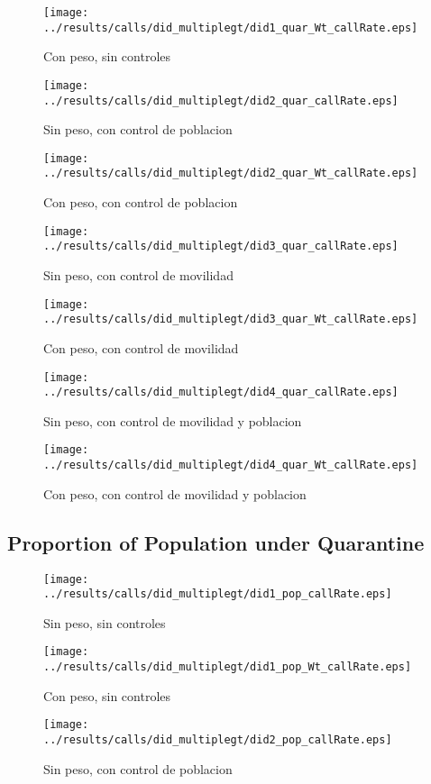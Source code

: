\documentclass[11pt,letterpaper]{article}
\begin{document}
\begin{figure}[H]
\caption{Con peso, sin controles}
\centering
\texttt{[image: ../results/calls/did\_multiplegt/did1\_quar\_Wt\_callRate.eps]}
\end{figure}
\begin{figure}[H]
\caption{Sin peso, con control de poblacion}
\centering
\texttt{[image: ../results/calls/did\_multiplegt/did2\_quar\_callRate.eps]}
\end{figure}

\begin{figure}[H]
\caption{Con peso, con control de poblacion}
\centering
\texttt{[image: ../results/calls/did\_multiplegt/did2\_quar\_Wt\_callRate.eps]}
\end{figure}
\begin{figure}[H]
\caption{Sin peso, con control de movilidad}
\centering
\texttt{[image: ../results/calls/did\_multiplegt/did3\_quar\_callRate.eps]}
\end{figure}

\begin{figure}[H]
\caption{Con peso, con control de movilidad}
\centering
\texttt{[image: ../results/calls/did\_multiplegt/did3\_quar\_Wt\_callRate.eps]}
\end{figure}
\begin{figure}[H]
\caption{Sin peso, con control de movilidad y poblacion}
\centering
\texttt{[image: ../results/calls/did\_multiplegt/did4\_quar\_callRate.eps]}
\end{figure}

\begin{figure}[H]
\caption{Con peso, con control de movilidad y poblacion}
\centering
\texttt{[image: ../results/calls/did\_multiplegt/did4\_quar\_Wt\_callRate.eps]}
\end{figure}

	\subsection{Proportion of Population under Quarantine}
\begin{figure}[H]
\caption{Sin peso, sin controles}
\centering
\texttt{[image: ../results/calls/did\_multiplegt/did1\_pop\_callRate.eps]}
\end{figure}

\begin{figure}[H]
\caption{Con peso, sin controles}
\centering
\texttt{[image: ../results/calls/did\_multiplegt/did1\_pop\_Wt\_callRate.eps]}
\end{figure}
\begin{figure}[H]
\caption{Sin peso, con control de poblacion}
\centering
\texttt{[image: ../results/calls/did\_multiplegt/did2\_pop\_callRate.eps]}
\end{figure}
\end{document}
